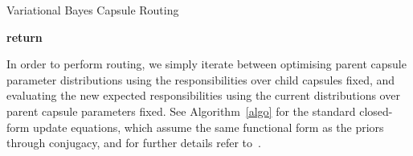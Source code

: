 \documentclass[letterpaper]{article} \usepackage{aaai20}  \usepackage{times}  \usepackage{helvet} \usepackage{courier}  \usepackage[hyphens]{url}  \usepackage{graphicx} \urlstyle{rm} \def\UrlFont{\rm}  \usepackage{graphicx}  \frenchspacing  \setlength{\pdfpagewidth}{8.5in}  \setlength{\pdfpageheight}{11in}  \nocopyright
\begin{document}
\begin{algorithm*}[t]
\footnotesize
\caption{Variational Bayes Capsule Routing}\label{algo}
\begin{algorithmic}[1]
\State {}
\State {}
\State {}
\EndFor
\State{}
\State \textbf{return} 
\EndFunction
{}
\State {}
\State {}
\State {}
\State {}
\EndFunction
{}
\State {}
\State {}
\State {}
\State {}
\EndFunction
{}
\State {}
\State {}
\State {}
\State {}
\State {}
\EndFunction
\end{algorithmic}
\end{algorithm*}
In order to perform routing, we simply iterate between optimising parent capsule parameter distributions  using the responsibilities over child capsules fixed, and evaluating the new expected responsibilities  using the current distributions over parent capsule parameters fixed. See Algorithm~\ref{algo} for the standard closed-form update equations, which assume the same functional form as the priors through conjugacy, and for further details refer to~\cite{bishop2006pattern}.
\end{document}
